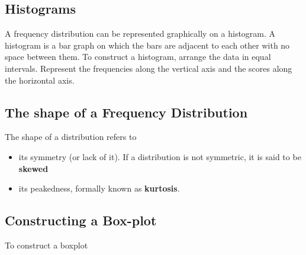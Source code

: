 \documentclass[12pt]{article}
\begin{document}
\subsection*{Histograms}

A frequency distribution can be represented graphically on a histogram. A histogram is a bar graph on which the bars are adjacent to each other with no space between them. To construct a histogram, arrange the data in equal intervals. Represent the frequencies along the vertical axis and the scores along the horizontal axis. 


\subsection{The shape of a Frequency Distribution}

The shape of a distribution refers to 
\begin{itemize}
\item its symmetry (or lack of it). If a distribution is not symmetric, it is said to be \textbf{skewed}
\item its peakedness, formally known as \textbf{kurtosis}.
\end{itemize}


\subsection{Constructing a Box-plot}
To construct a boxplot
\end{document}
